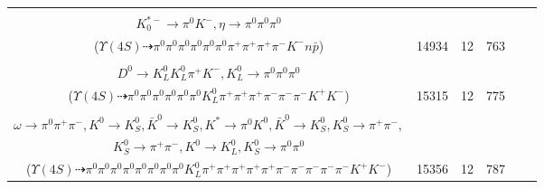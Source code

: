 \documentclass[landscape]{article}
\newcounter{rownumbers}
\newcommand\rn{\stepcounter{rownumbers}\arabic{rownumbers}}
\newcommand{\EOLP}{\\ \hline} %
\newcommand{\topoTags}[1]{#1} %
\begin{document}
\begin{longtable}{clcccc}
\rn & \makecell[l]{ $ 
\Upsilon(4S) \rightarrow B^{0} \bar{B}^{0} ,
B^{0} \rightarrow \rho^{+} \Delta^{0} \bar{\Lambda}_{c}^{-} ,
\bar{B}^{0} \rightarrow \pi^{+} K_{0}^{*-} ,
\rho^{+} \rightarrow \pi^{0} \pi^{+} ,
\Delta^{0} \rightarrow \pi^{0} n ,
\bar{\Lambda}_{c}^{-} \rightarrow \pi^{+} \pi^{-} \eta \bar{p} ,
$ \\ $
K_{0}^{*-} \rightarrow \pi^{0} K^{-} ,
\eta \rightarrow \pi^{0} \pi^{0} \pi^{0} 
$ \\ ($
\Upsilon(4S) \dashrightarrow \pi^{0} \pi^{0} \pi^{0} \pi^{0} \pi^{0} \pi^{0} \pi^{+} \pi^{+} \pi^{+} \pi^{-} K^{-} n \bar{p} 
$) } & \topoTags{14934 & }12 & 763 \EOLP

\rn & \makecell[l]{ $ 
\Upsilon(4S) \rightarrow B^{0} \bar{B}^{0} ,
B^{0} \rightarrow \pi^{-} K_{0}^{*+} ,
\bar{B}^{0} \rightarrow \pi^{0} \pi^{+} \pi^{-} \rho^{-} D^{*+} ,
K_{0}^{*+} \rightarrow \pi^{0} K^{+} ,
\rho^{-} \rightarrow \pi^{0} \pi^{-} ,
D^{*+} \rightarrow \pi^{+} D^{0} ,
$ \\ $
D^{0} \rightarrow K_{L}^{0} K_{L}^{0} \pi^{+} K^{-} ,
K_{L}^{0} \rightarrow \pi^{0} \pi^{0} \pi^{0} 
$ \\ ($
\Upsilon(4S) \dashrightarrow \pi^{0} \pi^{0} \pi^{0} \pi^{0} \pi^{0} \pi^{0} K_{L}^{0} \pi^{+} \pi^{+} \pi^{+} \pi^{-} \pi^{-} \pi^{-} K^{+} K^{-} 
$) } & \topoTags{15315 & }12 & 775 \EOLP

\rn & \makecell[l]{ $ 
\Upsilon(4S) \rightarrow B^{0} \bar{B}^{0} ,
B^{0} \rightarrow \pi^{0} \rho^{+} \rho^{-} \omega \omega K^{0} \bar{K}^{0} K^{*} ,
\bar{B}^{0} \rightarrow \bar{K}^{0} K^{+} K^{-} ,
\rho^{+} \rightarrow \pi^{0} \pi^{+} ,
\rho^{-} \rightarrow \pi^{0} \pi^{-} ,
\omega \rightarrow \pi^{0} \pi^{+} \pi^{-} ,
$ \\ $
\omega \rightarrow \pi^{0} \pi^{+} \pi^{-} ,
K^{0} \rightarrow K_{S}^{0} ,
\bar{K}^{0} \rightarrow K_{S}^{0} ,
K^{*} \rightarrow \pi^{0} K^{0} ,
\bar{K}^{0} \rightarrow K_{S}^{0} ,
K_{S}^{0} \rightarrow \pi^{+} \pi^{-} ,
$ \\ $
K_{S}^{0} \rightarrow \pi^{+} \pi^{-} ,
K^{0} \rightarrow K_{L}^{0} ,
K_{S}^{0} \rightarrow \pi^{0} \pi^{0} 
$ \\ ($
\Upsilon(4S) \dashrightarrow \pi^{0} \pi^{0} \pi^{0} \pi^{0} \pi^{0} \pi^{0} \pi^{0} \pi^{0} K_{L}^{0} \pi^{+} \pi^{+} \pi^{+} \pi^{+} \pi^{+} \pi^{-} \pi^{-} \pi^{-} \pi^{-} \pi^{-} K^{+} K^{-} 
$) } & \topoTags{15356 & }12 & 787 \EOLP


\end{longtable}
\end{document}
